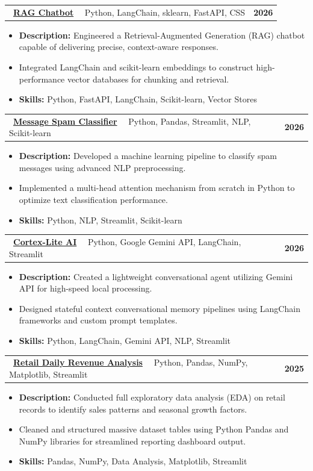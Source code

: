 \documentclass[letterpaper,11pt]{article}
\makeatletter
\newcommand{\resumeItem}[1]{
  \item\small{
    {#1 \vspace{-2pt}}
  }
}
\newcommand{\resumeProjectHeading}[2]{
    \item
    \begin{tabular*}{1.0\textwidth}{l@{\extracolsep{\fill}}r}
      \small#1 & \textbf{\small #2}\\
    \end{tabular*}\vspace{-3pt}
}
\newcommand{\resumeItemListStart}{\begin{itemize}}
\newcommand{\resumeItemListEnd}{\end{itemize}\vspace{-5pt}}
\makeatother
\begin{document}
    \resumeProjectHeading
      {\faGithub\ \href{https://github.com/swetank-mishra/Rag---chatbot}{\textbf{\large{RAG Chatbot}}} \ \textbar\ \large{Python, LangChain, sklearn, FastAPI, CSS}}{2026}
      \resumeItemListStart     
        \resumeItem{\normalsize{\textbf{Description:} Engineered a Retrieval-Augmented Generation (RAG) chatbot capable of delivering precise, context-aware responses.}}
        \resumeItem{\normalsize{Integrated LangChain and scikit-learn embeddings to construct high-performance vector databases for chunking and retrieval.}}
        \resumeItem{\normalsize{\textbf{Skills:} Python, FastAPI, LangChain, Scikit-learn, Vector Stores}}
      \resumeItemListEnd
      \vspace{-4pt}

    \resumeProjectHeading
      {\faGithub \ \href{https://github.com/swetank-mishra/spam-classifier}{\textbf{\large{Message Spam Classifier}}} \ \textbar \ \large{Python, Pandas, Streamlit, NLP, Scikit-learn}}{2026}
      \resumeItemListStart
        \resumeItem{\normalsize{\textbf{Description:} Developed a machine learning pipeline to classify spam messages using advanced NLP preprocessing.}}
        \resumeItem{\normalsize{Implemented a multi-head attention mechanism from scratch in Python to optimize text classification performance.}} 
        \resumeItem{\normalsize{\textbf{Skills:} Python, NLP, Streamlit, Scikit-learn}}
      \resumeItemListEnd 
      \vspace{-4pt}
      
    \resumeProjectHeading
      {\faGithub\ \href{https://github.com/swetank-mishra/cortex-lite}{\textbf{\large{Cortex-Lite AI}}} \ \textbar\ \large{Python, Google Gemini API, LangChain, Streamlit}}{2026}
      \resumeItemListStart
        \resumeItem{\normalsize{\textbf{Description:} Created a lightweight conversational agent utilizing Gemini API for high-speed local processing.}}
        \resumeItem{\normalsize{Designed stateful context conversational memory pipelines using LangChain frameworks and custom prompt templates.}}
        \resumeItem{\normalsize{\textbf{Skills:} Python, LangChain, Gemini API, NLP, Streamlit}}
      \resumeItemListEnd
      \vspace{-4pt}

    \resumeProjectHeading
      {\faGithub\ \href{https://github.com/swetank-mishra/Retail-Daily-Revenue-Analysis}{\textbf{\large{Retail Daily Revenue Analysis}}} \ \textbar\ \large{Python, Pandas, NumPy, Matplotlib, Streamlit}}{2025}
      \resumeItemListStart
        \resumeItem{\normalsize{\textbf{Description:} Conducted full exploratory data analysis (EDA) on retail records to identify sales patterns and seasonal growth factors.}}
        \resumeItem{\normalsize{Cleaned and structured massive dataset tables using Python Pandas and NumPy libraries for streamlined reporting dashboard output.}}
        \resumeItem{\normalsize{\textbf{Skills:} Pandas, NumPy, Data Analysis, Matplotlib, Streamlit}}
      \resumeItemListEnd
      \vspace{-2pt}
\end{document}
